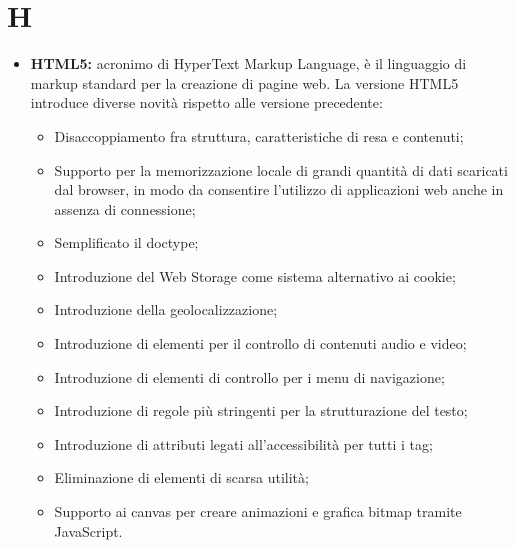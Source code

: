 \section*{H} %
\label{sec:h}
	\begin{itemize}
		\item \textbf{HTML5:} acronimo di HyperText Markup Language, è il linguaggio di markup standard per la creazione di pagine web. La versione HTML5 introduce diverse novità rispetto alle versione precedente:
		 \begin{itemize}
		 	\item Disaccoppiamento fra struttura, caratteristiche di resa e contenuti;
		 	\item Supporto per la memorizzazione locale di grandi quantità di dati scaricati dal browser, in modo da consentire l'utilizzo di applicazioni web anche in assenza di connessione;
		 	\item Semplificato il doctype;
		 	\item Introduzione del Web Storage come sistema alternativo ai cookie;
		 	\item Introduzione della geolocalizzazione;
			\item Introduzione di elementi per il controllo di contenuti audio e video;
			\item Introduzione di elementi di controllo per i menu di navigazione;
			\item Introduzione di regole più stringenti per la strutturazione del testo;
			\item Introduzione di attributi legati all'accessibilità per tutti i tag;
			\item Eliminazione di elementi di scarsa utilità;
			\item Supporto ai canvas per creare animazioni e grafica bitmap tramite JavaScript.
		 \end{itemize}
	\end{itemize}
\pagebreak

